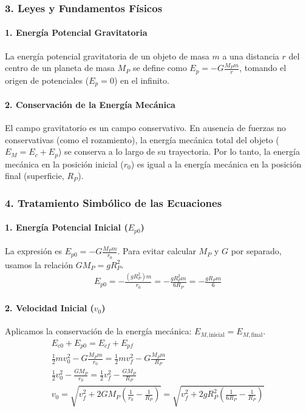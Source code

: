 \subsubsection*{3. Leyes y Fundamentos Físicos}
\paragraph*{1. Energía Potencial Gravitatoria}
La energía potencial gravitatoria de un objeto de masa $m$ a una distancia $r$ del centro de un planeta de masa $M_P$ se define como $E_p = -G \frac{M_P m}{r}$, tomando el origen de potenciales ($E_p=0$) en el infinito.

\paragraph*{2. Conservación de la Energía Mecánica}
El campo gravitatorio es un campo conservativo. En ausencia de fuerzas no conservativas (como el rozamiento), la energía mecánica total del objeto ($E_M = E_c + E_p$) se conserva a lo largo de su trayectoria. Por lo tanto, la energía mecánica en la posición inicial ($r_0$) es igual a la energía mecánica en la posición final (superficie, $R_P$).

\subsubsection*{4. Tratamiento Simbólico de las Ecuaciones}
\paragraph*{1. Energía Potencial Inicial ($E_{p0}$)}
La expresión es $E_{p0} = -G \frac{M_P m}{r_0}$. Para evitar calcular $M_P$ y $G$ por separado, usamos la relación $G M_P = g R_P^2$.
\begin{gather}
    E_{p0} = - \frac{(g R_P^2) m}{r_0} = - \frac{g R_P^2 m}{6 R_P} = - \frac{g R_P m}{6}
\end{gather}
\paragraph*{2. Velocidad Inicial ($v_0$)}
Aplicamos la conservación de la energía mecánica: $E_{M, \text{inicial}} = E_{M, \text{final}}$.
\begin{gather}
    E_{c0} + E_{p0} = E_{cf} + E_{pf} \nonumber \\[8pt]
    \frac{1}{2} m v_0^2 - G \frac{M_P m}{r_0} = \frac{1}{2} m v_f^2 - G \frac{M_P m}{R_P} \nonumber \\[8pt]
    \frac{1}{2} v_0^2 - \frac{G M_P}{r_0} = \frac{1}{2} v_f^2 - \frac{G M_P}{R_P} \nonumber \\[8pt]
    v_0 = \sqrt{v_f^2 + 2 G M_P \left( \frac{1}{r_0} - \frac{1}{R_P} \right)} = \sqrt{v_f^2 + 2 g R_P^2 \left( \frac{1}{6R_P} - \frac{1}{R_P} \right)}
\end{gather}

